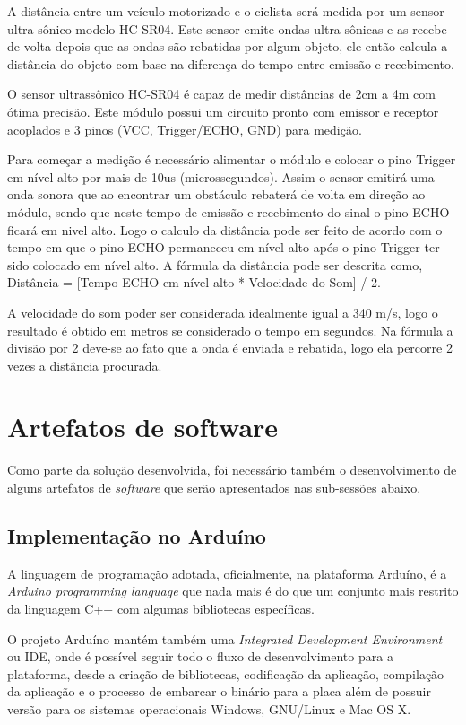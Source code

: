 \documentclass[final,12pt, times, 5p, twocolumn]{elsarticle}
\begin{document}
A distância entre um veículo motorizado e o ciclista será medida por um sensor ultra-sônico modelo HC-SR04. Este sensor emite ondas ultra-sônicas e as recebe de volta depois que as ondas são rebatidas por algum objeto, ele então calcula a distância do objeto com base na diferença do tempo entre emissão e recebimento.

O sensor ultrassônico HC-SR04 é capaz de medir distâncias de 2cm a 4m com ótima precisão. Este módulo possui um circuito pronto com emissor e receptor acoplados e 3 pinos (VCC, Trigger/ECHO, GND) para medição.

Para começar a medição é necessário alimentar o módulo e colocar o pino Trigger em nível alto por mais de 10us (microssegundos). Assim o sensor emitirá uma onda sonora que ao encontrar um obstáculo rebaterá de volta em direção ao módulo, sendo que neste tempo de emissão e recebimento do sinal o pino ECHO ficará em nivel alto. Logo o calculo da distância pode ser feito de acordo com o tempo em que o pino ECHO permaneceu em nível alto após o pino Trigger ter sido colocado em nível alto. A fórmula da distância pode ser descrita como, Distância = [Tempo ECHO em nível alto * Velocidade do Som] / 2.

A velocidade do som poder ser considerada idealmente igual a 340 m/s, logo o resultado é obtido em metros se considerado o tempo em segundos. Na fórmula a divisão por 2 deve-se ao fato que a onda é enviada e rebatida, logo ela percorre 2 vezes a distância procurada.

\section{Artefatos de software}

Como parte da solução desenvolvida, foi necessário também o desenvolvimento de alguns artefatos de \textit{software} que serão apresentados nas sub-sessões abaixo.

\subsection{Implementação no Arduíno}

A linguagem de programação adotada, oficialmente, na plataforma Arduíno, é a \textit{Arduino programming language}\cite{arduinopl} que nada mais é do que um conjunto mais restrito da linguagem C++ com algumas bibliotecas específicas.

O projeto Arduíno mantém também uma \textit{Integrated Development Environment} ou IDE, onde é possível seguir todo o fluxo de desenvolvimento para a plataforma, desde a criação de bibliotecas, codificação da aplicação, compilação da aplicação e o processo de embarcar o binário para a placa além de possuir versão para os sistemas  operacionais Windows, GNU/Linux e Mac OS X.
\end{document}
